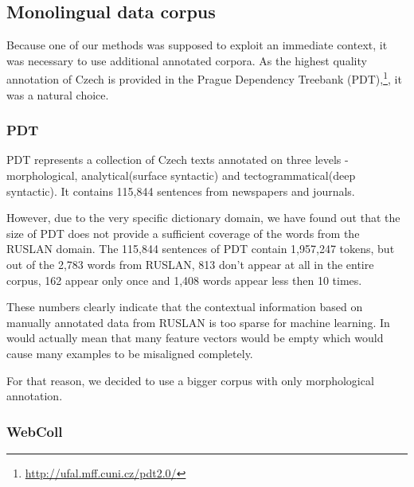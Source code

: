 \documentclass[letterpaper]{article}
\newcommand{\todofn}[1] {
 \footnote{\textbf{TODO : #1}}}
\begin{document}

\subsection{Monolingual data corpus}
Because one of our methods was supposed to exploit an immediate context, it was necessary to use additional annotated 
corpora. As the highest quality annotation of Czech is provided in the Prague Dependency 
Treebank (PDT),\footnote{\url{http://ufal.mff.cuni.cz/pdt2.0/}}, it was a natural choice.   


\subsubsection{PDT}
PDT 
represents a collection of Czech texts annotated on three
levels - morphological, analytical(surface syntactic) and tectogrammatical(deep syntactic). It   
contains 115,844 sentences from newspapers and journals.

However, due to the very specific dictionary domain, we have found out that the size of PDT does not provide a sufficient coverage of the words from the RUSLAN domain. 
The 115,844 sentences of PDT contain 1,957,247 tokens, but out of the 2,783 words from RUSLAN, 813 don't appear at all in the entire corpus, 162 appear only once and 
1,408 words appear less then 10 times.

These numbers clearly indicate that the contextual information based on manually annotated data from RUSLAN is too sparse for machine learning. In would actually mean that many feature vectors would be empty 
which would cause 
many examples to be misaligned completely.

For that reason, we decided to use a bigger corpus with only morphological annotation.

\subsubsection{WebColl}
\end{document}
